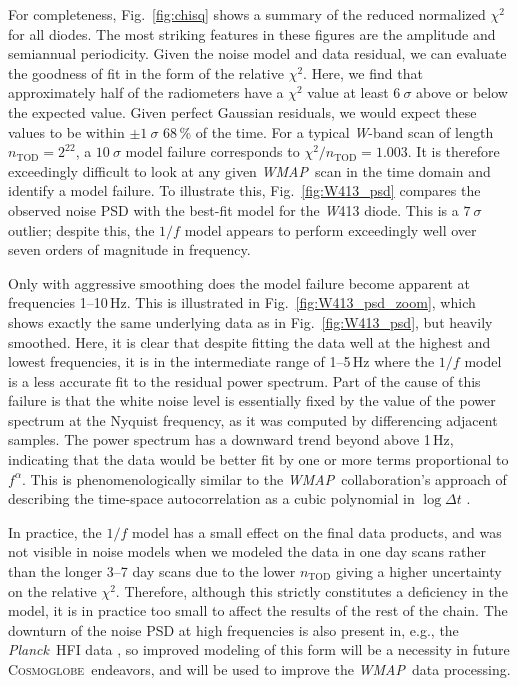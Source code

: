 \documentclass[twocolumn]{../../common/aa}
\def\WMAP{\emph{WMAP}}
\def\Planck{\emph{Planck}}
\newcommand{\cosmoglobe}{\textsc{Cosmoglobe}}
\newcommand{\W}[0]{\textit W}
\begin{document}
For completeness, Fig.~\ref{fig:chisq} shows a summary of the reduced
normalized $\chi^2$ for all diodes. The most striking features in
these figures are the amplitude and semiannual periodicity.  Given
the noise model and data residual, we can evaluate the goodness of fit
in the form of the relative $\chi^2$. Here, we find that approximately
half of the radiometers have a $\chi^2$ value at least $6~\sigma$ above
or below the expected value.  Given perfect Gaussian residuals, we
would expect these values to be within $\pm1~\sigma$ 68\,\% of the time. For
a typical \W-band scan of length $n_\mathrm{TOD}=2^{22}$, a $10~\sigma$
model failure corresponds to $\chi^2/n_\mathrm{TOD}=1.003$. It is
therefore exceedingly difficult to look at any given \WMAP\ scan in
the time domain and identify a model failure. To illustrate this,
Fig.~\ref{fig:W413_psd} compares the observed noise PSD with the
best-fit model for the \W413 diode. This is a $7~\sigma$ outlier;
despite this, the $1/f$ model appears to perform exceedingly well over
seven orders of magnitude in frequency.

Only with aggressive smoothing does the model failure become apparent
at frequencies 1--10\,Hz. This is illustrated in
Fig.~\ref{fig:W413_psd_zoom}, which shows exactly the same underlying
data as in Fig.~\ref{fig:W413_psd}, but heavily smoothed. Here, it is
clear that despite fitting the data well at the highest and lowest
frequencies, it is in the intermediate range of 1--5\,Hz where the
$1/f$ model is a less accurate fit to the residual power
spectrum. Part of the cause of this failure is that the white noise
level is essentially fixed by the value of the power spectrum at the
Nyquist frequency, as it was computed by differencing adjacent
samples. The power spectrum has a downward trend beyond above 1\,Hz,
indicating that the data would be better fit by one or more terms
proportional to $f^\alpha$. This is phenomenologically similar to the
\WMAP\ collaboration's approach of describing the time-space
autocorrelation as a cubic polynomial in $\log\Delta t$
\citep{jarosik2007}.

In practice, the $1/f$ model has a small effect on the final data products, and
was not visible in noise models when we modeled the data in one day scans
rather than the longer 3--7 day scans due to the lower $n_\mathrm{TOD}$ giving
a higher uncertainty on the relative $\chi^2$.  Therefore, although this
strictly constitutes a deficiency in the model, it is in practice too small to
affect the results of the rest of the chain. The downturn of the noise PSD at
high frequencies is also present in, e.g., the \Planck\ HFI data
\citep[Fig.~1]{planck2014-a10}, so improved modeling of this form will be a
necessity in future \cosmoglobe\ endeavors, and will be used to improve the
\WMAP\ data processing.
\end{document}
